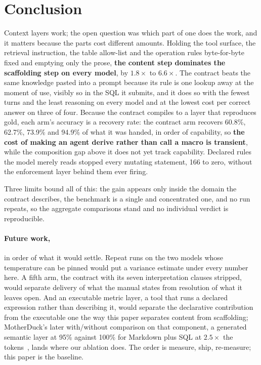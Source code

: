 \section{Conclusion}
\label{sec:conclusion}

Context layers work; the open question was which part of one does the
work, and it matters because the parts cost different amounts. Holding the
tool surface, the retrieval instruction, the table allow-list and the
operation rules byte-for-byte fixed and emptying only the prose,
\textbf{the content step dominates the scaffolding step on every model}, by
$1.8{\times}$ to $6.6{\times}$. The contract beats the same knowledge
pasted into a prompt because its rule is one lookup away at the moment of
use, visibly so in the SQL it submits, and it does so with the fewest turns
and the least reasoning on every model and at the lowest cost per correct
answer on three of four. Because the contract compiles to a layer that
reproduces gold, each arm's accuracy is a recovery rate: the contract arm
recovers 60.8\%, 62.7\%, 73.9\% and 94.9\% of what it was handed, in order
of capability, so \textbf{the cost of making an agent derive rather than
call a macro is transient}, while the composition gap above it does not yet
track capability. Declared rules the model merely reads stopped every
mutating statement, 166 to zero, without the enforcement layer behind them
ever firing.

Three limits bound all of this: the gain appears only inside the domain the
contract describes, the benchmark is a single and concentrated one, and no
run repeats, so the aggregate comparisons stand and no individual verdict
is reproducible.

\paragraph{Future work,} in order of what it would settle. Repeat runs on
the two models whose temperature can be pinned would put a variance
estimate under every number here. A fifth arm, the contract with its seven
interpretation clauses stripped, would separate delivery of what the manual
states from resolution of what it leaves open. And an executable metric
layer, a tool that runs a declared expression rather than describing it,
would separate the declarative contribution from the executable one the way
this paper separates content from scaffolding; MotherDuck's later
with/without comparison on that component, a generated semantic layer at
95\% against 100\% for Markdown plus SQL at $2.5{\times}$ the
tokens~\cite{motherduck-ai-writes}, lands where our ablation does. The
order is measure, ship, re-measure; this paper is the baseline.

